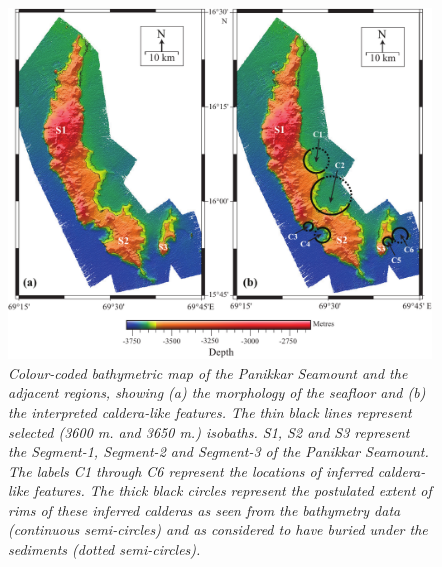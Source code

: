 \documentclass[twocolumn]{article}
\begin{document}
\begin{figure}[!htb]
	\centering
	\includegraphics[width=\textwidth]{panikkar-seamount.pdf}
	\caption{
		\textsl{Colour-coded bathymetric map of the Panikkar Seamount and the adjacent regions, showing (a) the morphology of the seafloor and (b) the interpreted caldera-like features. The thin black lines represent selected (3600 m. and 3650 m.) isobaths. S1, S2 and S3 represent the Segment-1, Segment-2 and Segment-3 of the Panikkar Seamount. The labels C1 through C6 represent the locations of inferred caldera-like features. The thick black circles represent the postulated extent of rims of these inferred calderas as seen from the bathymetry data (continuous semi-circles) and as considered to have buried under the sediments (dotted semi-circles).}
	}
	\label{panikkar}
\end{figure}
\end{document}
